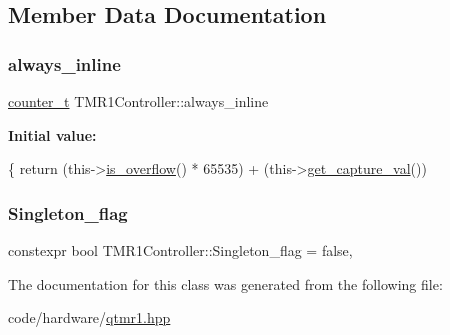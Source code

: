 \subsection{Member Data Documentation}
\mbox{\label{classTMR1Controller_adce8e8a496510485a88ccc5b88595672}} 
\subsubsection{\texorpdfstring{always\+\_\+inline}{always\_inline}}
{\footnotesize\ttfamily \hyperlink{types_8hpp_a22f279793847eba127de149437848c48}{counter\+\_\+t} T\+M\+R1\+Controller\+::always\+\_\+inline}

{\bfseries Initial value\+:}
\begin{DoxyCode}
\{
        \textcolor{keywordflow}{return} (this->\hyperlink{classTMR1Controller_a06052b4a881156be3c7a4b6495d8ca11}{is\_overflow}() * 65535) + (this->\hyperlink{classTMR1Controller_a3d07eed72365e7a7b44fadefb23b9ba6}{get\_capture\_val}())
\end{DoxyCode}
\mbox{\label{classTMR1Controller_a532b729ca9a7c28e5f4d221f80487241}} 
\subsubsection{\texorpdfstring{Singleton\+\_\+flag}{Singleton\_flag}}
{\footnotesize\ttfamily constexpr bool T\+M\+R1\+Controller\+::\+Singleton\+\_\+flag = false\hspace{0.3cm}{\ttfamily [static]}, {\ttfamily [private]}}



The documentation for this class was generated from the following file\+:\begin{DoxyCompactItemize}
\item 
code/hardware/\hyperlink{qtmr1_8hpp}{qtmr1.\+hpp}\end{DoxyCompactItemize}
